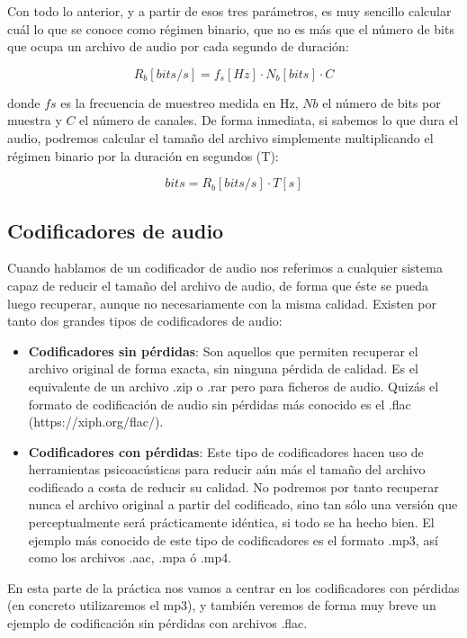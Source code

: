 \documentclass[es,practica]{uah}
\begin{document}
Con todo lo anterior, y a partir de esos tres parámetros, es muy sencillo calcular cuál lo que se conoce como régimen binario, que no es más que el número de bits que ocupa un archivo de audio por cada segundo de duración: 

\begin{equation}
	R_b[bits/s] = f_s[Hz] \cdot N_b[bits] \cdot C 
\end{equation}

donde $fs$ es la frecuencia de muestreo medida en Hz, $Nb$ el número de bits por muestra y $C$ el número de canales. De forma inmediata, si sabemos lo que dura el audio, podremos calcular el tamaño del archivo simplemente multiplicando el régimen binario por la duración en segundos (T):

\begin{equation}
	bits = R_b[bits/s] \cdot T[s]
\end{equation}

\subsection{Codificadores de audio}


Cuando hablamos de un codificador de audio nos referimos a cualquier sistema capaz de reducir el tamaño del archivo de audio, de forma que éste se pueda luego recuperar, aunque no necesariamente con la misma calidad. Existen por tanto dos grandes tipos de codificadores de audio:

\begin{itemize}
	\item {\bf Codificadores sin pérdidas}: Son aquellos que permiten recuperar el archivo original de forma exacta, sin ninguna pérdida de calidad. Es el equivalente de un archivo .zip o .rar pero para ficheros de audio. Quizás el formato de codificación de audio sin pérdidas más conocido es el .flac (https://xiph.org/flac/).
	\item {\bf Codificadores con pérdidas}: Este tipo de codificadores hacen uso de herramientas psicoacústicas para reducir aún más el tamaño del archivo codificado a costa de reducir su calidad. No podremos por tanto recuperar nunca el archivo original a partir del codificado, sino tan sólo una versión que perceptualmente será prácticamente idéntica, si todo se ha hecho bien. El ejemplo más conocido de este tipo de codificadores es el formato .mp3, así como los archivos .aac, .mpa ó .mp4.
\end{itemize}

En esta parte de la práctica nos vamos a centrar en los codificadores con pérdidas (en concreto utilizaremos el mp3), y también veremos de forma muy breve un ejemplo de codificación sin pérdidas con archivos .flac.
\end{document}
